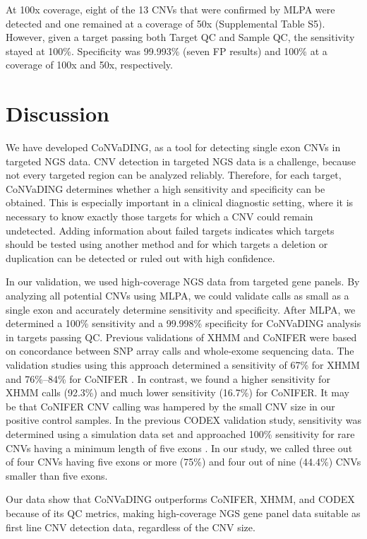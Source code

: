 At 100x coverage, eight of the 13 CNVs that were confirmed by MLPA were detected and one remained at a coverage of 50x (Supplemental Table S5).
However, given a target passing both Target QC and Sample QC, the sensitivity stayed at 100\%. Specificity was 99.993\% (seven FP results) and 100\% at a coverage of 100x and 50x, respectively.


\section{Discussion}\label{discussion}
We have developed CoNVaDING, as a tool for detecting single exon CNVs in targeted NGS data. 
CNV detection in targeted NGS data is a challenge, because not every targeted region can be analyzed reliably. 
Therefore, for each target, CoNVaDING determines whether a high sensitivity and specificity can be obtained. 
This is especially important in a clinical diagnostic setting, where it is necessary to know exactly those targets for which a CNV could remain undetected. Adding information about failed targets indicates which targets should be tested using another method and for which targets a deletion or duplication can be detected or ruled out with high confidence.

In our validation, we used high-coverage NGS data from targeted gene panels. 
By analyzing all potential CNVs using MLPA, we could validate calls as small as a single exon and accurately determine sensitivity and specificity. After MLPA, we determined a 100\% sensitivity and a 99.998\% specificity for CoNVaDING analysis in targets passing QC. 
Previous validations of XHMM and CoNIFER were based on concordance between SNP array calls and whole-exome sequencing data. 
The validation studies using this approach determined a sensitivity of 67\% for XHMM \cite{Fromer_2012} and 76\%–84\% for CoNIFER \cite{Krumm_2012}. 
In contrast, we found a higher sensitivity for XHMM calls (92.3\%) and much lower sensitivity (16.7\%) for CoNIFER. 
It may be that CoNIFER CNV calling was hampered by the small CNV size in our positive control samples. 
In the previous CODEX validation study, sensitivity was determined using a simulation data set and approached 100\% sensitivity for rare CNVs having a minimum length of five exons \cite{Jiang_2015}. 
In our study, we called three out of four CNVs having five exons or more (75\%) and four out of nine (44.4\%) CNVs smaller than five exons.

Our data show that CoNVaDING outperforms CoNIFER, XHMM, and CODEX because of its QC metrics, making high-coverage NGS gene panel data suitable as first line CNV detection data, regardless of the CNV size. 

